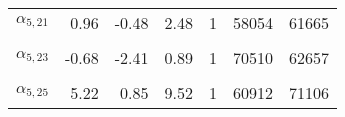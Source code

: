 \begin{longtable}[t]{lrrrrrr}
$\alpha_{5, 21}$ & 0.96 & -0.48 & 2.48 & 1 & 58054 & 61665\\
\cellcolor{gray!6}{$\alpha_{5, 22}$} & \cellcolor{gray!6}{2.69} & \cellcolor{gray!6}{0.76} & \cellcolor{gray!6}{5.20} & \cellcolor{gray!6}{1} & \cellcolor{gray!6}{58454} & \cellcolor{gray!6}{51026}\\
$\alpha_{5, 23}$ & -0.68 & -2.41 & 0.89 & 1 & 70510 & 62657\\
\cellcolor{gray!6}{$\alpha_{5, 24}$} & \cellcolor{gray!6}{0.50} & \cellcolor{gray!6}{-1.15} & \cellcolor{gray!6}{2.26} & \cellcolor{gray!6}{1} & \cellcolor{gray!6}{58202} & \cellcolor{gray!6}{61065}\\
$\alpha_{5, 25}$ & 5.22 & 0.85 & 9.52 & 1 & 60912 & 71106\\*
\end{longtable}
